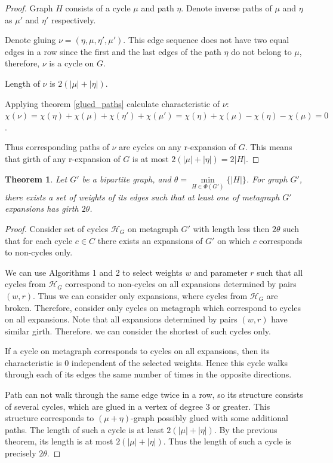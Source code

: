 \documentclass[a4paper,fleqn]{cas-sc}
\newtheorem{theorem}{Theorem}
\begin{document}
\begin{proof}
    Graph $H$ consists of a cycle $\mu$ and path $\eta$. Denote inverse paths of $\mu$ and $\eta$ as $\mu'$ and $\eta'$ respectively.

    Denote gluing $\nu = (\eta, \mu, \eta', \mu')$. This edge sequence does not have two equal edges in a row since the first and the last edges of the path $\eta$ do not belong to $\mu$, therefore, $\nu$ is a cycle on $G$.

    Length of $\nu$ is $2(|\mu| + |\eta|)$.

    Applying theorem \ref{glued_paths} calculate characteristic of $\nu$: $\chi(\nu) = \chi(\eta) + \chi(\mu) + \chi(\eta') + \chi(\mu') = \chi(\eta) + \chi(\mu) - \chi(\eta) - \chi(\mu) = 0$.

    Thus corresponding paths of $\nu$ are cycles on any r-expansion of $G$. This means that girth of any r-expansion of $G$ is at most $2(|\mu| + |\eta|) = 2|H|$.
\end{proof}

\begin{theorem}

Let $G'$ be a bipartite graph, and $\theta = \min\limits_{H \in \Phi(G')} \{ |H| \}$. For graph $G'$, there exists a set of weights of its edges such that at least one of metagraph $G'$ expansions has girth $2 \theta$.

\end{theorem}

\begin{proof}

Consider set of cycles $\mathcal{H}_G$ on metagraph $G'$ with length less then $2 \theta$ such that for each cycle $c \in C$ there exists an expansions of $G'$ on which $c$ corresponds to non-cycles only. 

We can use Algorithms 1 and 2 to select weights $w$ and parameter $r$ such that all cycles from $\mathcal{H}_G$ correspond to non-cycles on all expansions determined by pairs $(w, r)$. Thus we can consider only expansions, where cycles from $\mathcal{H}_G$ are broken. Therefore, consider only cycles on metagraph which correspond to cycles on all expansions. Note that all expansions determined by pairs $(w, r)$ have similar girth. Therefore. we can consider the shortest of such cycles only.

If a cycle on metagraph corresponds to cycles on all expansions, then its characteristic is $0$ independent of the selected weights. Hence this cycle walks through each of its edges the same number of times in the opposite directions.

Path can not walk through the same edge twice in a row, so its structure consists of several cycles, which are glued in a vertex of degree $3$ or greater. This structure corresponds to $(\mu + \eta)$-graph possibly glued with some additional paths. The length of such a cycle is at least $2(|\mu| + |\eta|)$. By the previous theorem, its length is at most $2(|\mu| + |\eta|)$. Thus the length of such a cycle is precisely $2 \theta$.

\end{proof}
\end{document}
